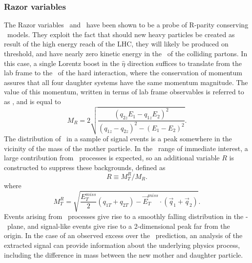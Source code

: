 \subsubsection{Razor variables}
The Razor variables \cite{Rogan:2010kb} \RazorMr~and \RazorRsq~have been shown \cite{Chatrchyan:2012uea} to be a probe of R-parity conserving \SUSY~models. They exploit the fact that should new heavy particles be created as result of the high energy reach of the LHC, they will likely be produced on threshold, and have nearly zero kinetic energy in the \CMframe~of the colliding partons. In this case, a single Lorentz boost in the $\hat{\eta}$ direction suffices to translate from the lab frame to the \CMframe~of the hard interaction, where the conservation of momentum assures that all four daughter systems have the same momentum magnitude. The value of this momentum, written in terms of lab frame observables is referred to as \RazorMr, and is equal to
\begin{equation}
M_{R}=2\sqrt{\frac{(q_{2z}E_{1}-q_{1z}E_{2})^2}{(q_{1z}-q_{2z})^2-(E_{1}-E_{2})^2}}.
\label{eq:Mr}
\end{equation}
The distribution of \RazorMr~in a sample of signal events is a peak somewhere in the vicinity of the mass of the mother particle. In the \RazorMr~range of immediate interest, a large contribution from \SM~processes is expected, so an additional variable $R$ is constructed to suppress these backgrounds, defined as
\begin{equation}
\label{eq:R}
R\equiv M_{T}^{R}/M_{R}.
\end{equation}
where
\begin{equation}
M_{T}^{R}=\sqrt{\frac{E_{T}^{miss}}{2}(q_{1T}+q_{2T})-\vec{E}_{T}^{miss}\cdot(\vec{q}_1+\vec{q}_2)}.
\end{equation}
Events arising from \SM~processes give rise to a smoothly falling distribution in the \RazorRsq-\RazorMr~plane, and signal-like events give rise to a 2-dimensional peak far from the origin. In the case of an observed excess over the \SM~prediction, an analysis of the extracted signal can provide information about the underlying physics process, including the difference in mass between the new mother and daughter particle.

